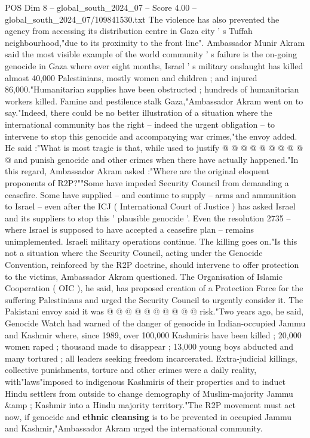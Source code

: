 \begin{textsample}{POS Dim 8 – global\_south\_2024\_07 – Score 4.00 – global\_south\_2024\_07/109841530.txt}
The violence has also prevented the agency from accessing its distribution centre in Gaza city ' s Tuffah neighbourhood,"due to its proximity to the front line".
Ambassador Munir Akram said the most visible example of the world community ' s failure is the on-going genocide in Gaza where over eight months, Israel ' s military onslaught has killed almost 40,000 Palestinians, mostly women and children ; and injured 86,000."Humanitarian supplies have been obstructed ; hundreds of humanitarian workers killed.
Famine and pestilence stalk Gaza,"Ambassador Akram went on to say."Indeed, there could be no better illustration of a situation where the international community has the right -- indeed the urgent obligation -- to intervene to stop this genocide and accompanying war crimes,"the envoy added.
He said :"What is most tragic is that, while used to justify @ @ @ @ @ @ @ @ @ @ and punish genocide and other crimes when there have actually happened."In this regard, Ambassador Akram asked :"Where are the original eloquent proponents of R2P?""Some have impeded Security Council from demanding a ceasefire.
Some have supplied -- and continue to supply -- arms and ammunition to Israel -- even after the ICJ ( International Court of Justice ) has asked Israel and its suppliers to stop this ' plausible genocide '.
Even the resolution 2735 -- where Israel is supposed to have accepted a ceasefire plan -- remains unimplemented.
Israeli military operations continue.
The killing goes on."Is this not a situation where the Security Council, acting under the Genocide Convention, reinforced by the R2P doctrine, should intervene to offer protection to the victims, Ambassador Akram questioned.
The Organisation of Islamic Cooperation ( OIC ), he said, has proposed creation of a Protection Force for the suffering Palestinians and urged the Security Council to urgently consider it.
The Pakistani envoy said it was @ @ @ @ @ @ @ @ @ @ risk."Two years ago, he said, Genocide Watch had warned of the danger of genocide in Indian-occupied Jammu and Kashmir where, since 1989, over 100,000 Kashmiris have been killed ; 20,000 women raped ; thousand made to disappear ; 13,000 young boys abducted and many tortured ; all leaders seeking freedom incarcerated.
Extra-judicial killings, collective punishments, torture and other crimes were a daily reality, with"laws"imposed to indigenous Kashmiris of their properties and to induct Hindu settlers from outside to change demography of Muslim-majority Jammu \&amp ; Kashmir into a Hindu majority territory."The R2P movement must act now, if genocide and \textbf{ethnic} \textbf{cleansing} is to be prevented in occupied Jammu and Kashmir,"Ambassador Akram urged the international community.

\end{textsample}
